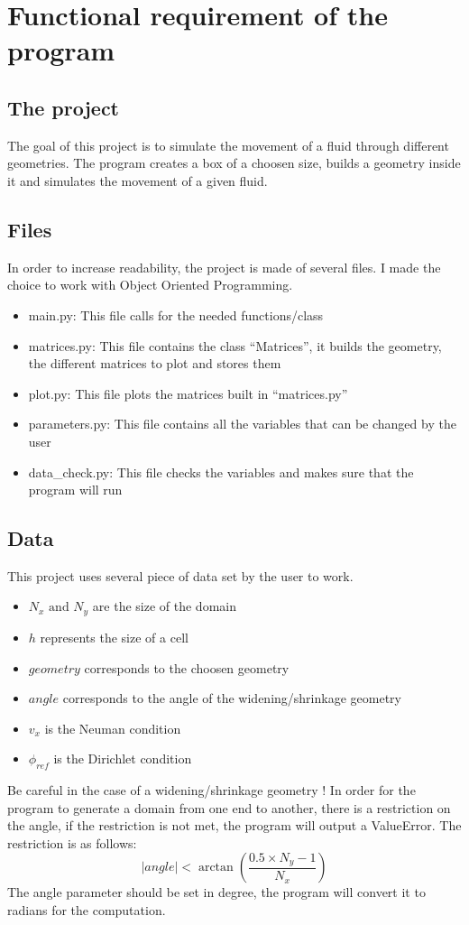 \section{Functional requirement of the program}
\subsection{The project}
The goal of this project is to simulate the movement of a fluid through
different geometries. The program creates a box of a choosen size, builds a
geometry inside it and simulates the movement of a given fluid.

\subsection{Files}
In order to increase readability, the project is made of several files.
I made the choice to work with Object Oriented Programming.
\begin{itemize}
    \item main.py: This file calls for the needed functions/class
    \item matrices.py: This file contains the class ``Matrices'', it builds the
          geometry, the different matrices to plot and stores them
    \item plot.py: This file plots the matrices built in ``matrices.py''
    \item parameters.py: This file contains all the variables that can be 
          changed by the user
    \item data\_check.py: This file checks the variables and makes sure that
          the program will run
\end{itemize}

\subsection{Data}
This project uses several piece of data set by the user to work.
\begin{itemize}
    \item $N_x \text{ and } N_y$ are the size of the domain
    \item $h$ represents the size of a cell
    \item $geometry$ corresponds to the choosen geometry
    \item $angle$ corresponds to the angle of the widening/shrinkage geometry
    \item $v_x$ is the Neuman condition
    \item $\phi_{ref}$ is the Dirichlet condition
\end{itemize}
Be careful in the case of a widening/shrinkage geometry !
In order for the program to generate a domain from one end to another, there is
a restriction on the angle, if the restriction is not met, the program will
output a ValueError. The restriction is as follows:
\[
      |angle| < \arctan{\left(\dfrac{0.5 \times N_y - 1}{N_x}\right)}
\]
The angle parameter should be set in degree, the program will convert it to
radians for the computation.

